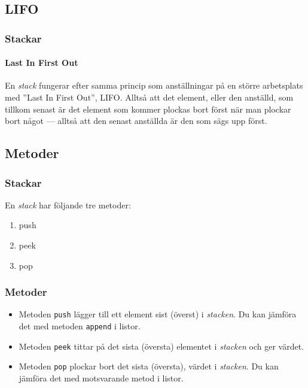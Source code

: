 \documentclass[aspectratio=169]{beamer}
\begin{document}
\subsection{LIFO}

\begin{frame}
	\frametitle{Stackar}
	\framesubtitle{Last In First Out}
	
	En \textit{stack} fungerar efter samma princip som anställningar på en större arbetsplats med ''Last In First Out'', LIFO. Alltså att det element, eller den anställd, som tillkom senast är det element som kommer plockas bort först när man plockar bort något --- alltså att den senast anställda är den som sägs upp först.

\end{frame}

\subsection{Metoder}

\begin{frame}
	\frametitle{Stackar}
	
	En \textit{stack} har följande tre metoder:
	
	\begin{enumerate}
		\item push
		\item peek			
		\item pop
	\end{enumerate}
	
\end{frame}


\begin{frame}
	\frametitle{Metoder}
	
	\begin{itemize}[<+->]
		\item Metoden \texttt{push} lägger till ett element sist  (överst) i \textit{stacken}. Du kan jämföra det med metoden \texttt{append} i listor.
	
		\item Metoden \texttt{peek} tittar på det sista (översta) elementet i \textit{stacken} och ger värdet.
	
		\item Metoden \texttt{pop} plockar bort det sista (översta), värdet i \textit{stacken}. Du kan jämföra det med motsvarande metod i listor.
		
	\end{itemize}
	
\end{frame}
\end{document}
